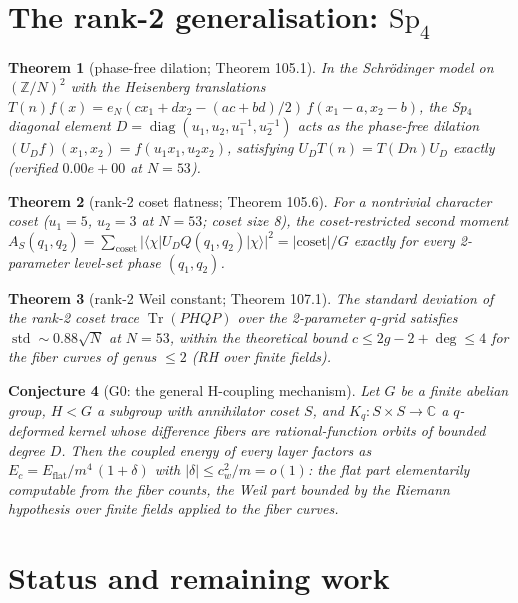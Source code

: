 \documentclass[11pt]{article}
\newtheorem{theorem}{Theorem}[section]
\newtheorem{conjecture}[theorem]{Conjecture}
\begin{document}
\section{The rank-2 generalisation: \texorpdfstring{$\mathrm{Sp}_4$}{Sp4}}\label{sec:rank2}

\begin{theorem}[phase-free dilation; Theorem 105.1]
\label{thm:sp4dilation}
In the Schr\"odinger model on $(\mathbb{Z}/N)^2$ with the Heisenberg
translations $T(n)f(x) = e_N(c x_1 + d x_2 - (ac{+}bd)/2)\,
f(x_1{-}a, x_2{-}b)$, the Sp$_4$ diagonal element
$D = \operatorname{diag}(u_1, u_2, u_1^{-1}, u_2^{-1})$ acts as the
phase-free dilation $(U_D f)(x_1,x_2) = f(u_1 x_1, u_2 x_2)$, satisfying
$U_D T(n) = T(Dn) U_D$ exactly (verified $0.00e{+}00$ at $N = 53$).
\end{theorem}

\begin{theorem}[rank-2 coset flatness; Theorem 105.6]
\label{thm:rank2flat}
For a nontrivial character coset ($u_1 = 5$, $u_2 = 3$ at $N = 53$;
coset size 8), the coset-restricted second moment
$A_S(q_1,q_2) = \sum_{\mathrm{coset}} |\langle\chi|U_D Q(q_1,q_2)
|\chi\rangle|^2 = |\mathrm{coset}|/G$ exactly for every
2-parameter level-set phase $(q_1,q_2)$.
\end{theorem}

\begin{theorem}[rank-2 Weil constant; Theorem 107.1]
\label{thm:rank2weil}
The standard deviation of the rank-2 coset trace
$\operatorname{Tr}(PHQP)$ over the 2-parameter $q$-grid satisfies
$\operatorname{std} \sim 0.88\sqrt{N}$ at $N = 53$, within the
theoretical bound $c \le 2g - 2 + \deg \le 4$ for the fiber curves of
genus $\le 2$ (RH over finite fields).
\end{theorem}

\begin{conjecture}[G0: the general H-coupling mechanism]
\label{conj:G0}
Let $G$ be a finite abelian group, $H < G$ a subgroup with
annihilator coset $S$, and $K_q: S \times S \to \mathbb{C}$ a
$q$-deformed kernel whose difference fibers are rational-function
orbits of bounded degree $D$.  Then the coupled energy of every layer
factors as $E_c = E_{\mathrm{flat}}/m^4\,(1 + \delta)$ with
$|\delta| \le c_w^2/m = o(1)$: the flat part elementarily computable
from the fiber counts, the Weil part bounded by the Riemann
hypothesis over finite fields applied to the fiber curves.
\end{conjecture}

\section{Status and remaining work}\label{sec:status}
\end{document}
